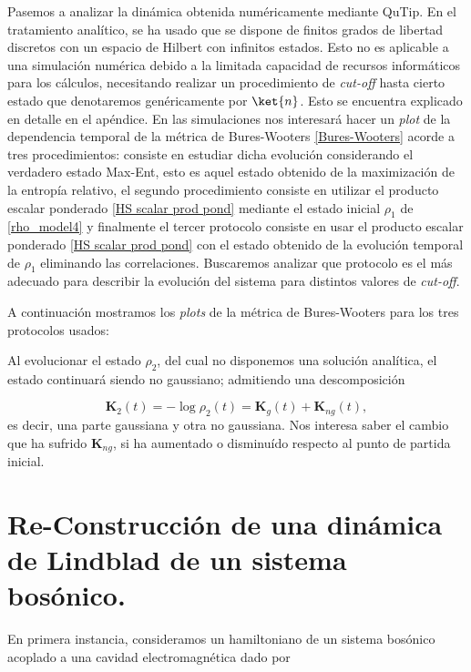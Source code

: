 Pasemos a analizar la dinámica obtenida numéricamente mediante QuTip. En el tratamiento analítico, se ha usado que se dispone de finitos grados de libertad discretos con un espacio de Hilbert con infinitos estados. Esto no es aplicable a una simulación numérica debido a la limitada capacidad de recursos informáticos para los cálculos, necesitando realizar un procedimiento de \textit{cut-off} hasta cierto estado que denotaremos genéricamente por $\ket{n}$. Esto se encuentra explicado en detalle en el apéndice. En las simulaciones nos interesará hacer un \textit{plot} de la dependencia temporal de la métrica de Bures-Wooters \eqref{Bures-Wooters} acorde a tres procedimientos: consiste en estudiar dicha evolución considerando el verdadero estado Max-Ent, esto es aquel estado obtenido de la maximización de la entropía relativo, el segundo procedimiento consiste en utilizar el producto escalar ponderado \eqref{HS scalar prod pond} mediante el estado inicial $\rho_1$ de \eqref{rho_model4} y finalmente el tercer protocolo consiste en usar el producto escalar ponderado \eqref{HS scalar prod pond} con el estado obtenido de la evolución temporal de $\rho_1$ eliminando las correlaciones. Buscaremos analizar que protocolo es el más adecuado para describir la evolución del sistema para distintos valores de \textit{cut-off}.

A continuación mostramos los \textit{plots} de la métrica de Bures-Wooters para los tres protocolos usados:




Al evolucionar el estado $\rho_2$, del cual no disponemos una solución analítica, el estado continuará siendo no gaussiano; admitiendo una descomposición 

$$
\mathbf{K}_2(t) = -\log \rho_2(t) = \mathbf{K}_{g}(t)+\mathbf{K}_{ng}(t),
$$
es decir, una parte gaussiana y otra no gaussiana. Nos interesa saber el cambio que ha sufrido $\mathbf{K}_{ng}$, si ha aumentado o disminuído respecto al punto de partida inicial.
 
 
 
 
 
 
 \section{Re-Construcci\'on de una din\'amica de Lindblad de un sistema bos\'onico.}

En primera instancia, consideramos un hamiltoniano de un sistema bosónico acoplado a una cavidad electromagnética dado por 

